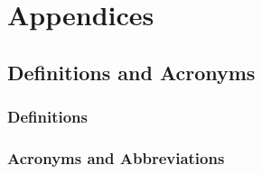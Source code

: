 \documentclass[a4paper, 11pt]{article}
\begin{document}
\section{Appendices}

\subsection{Definitions and Acronyms}
\subsubsection{Definitions}
\subsubsection{Acronyms and Abbreviations}
\end{document}
